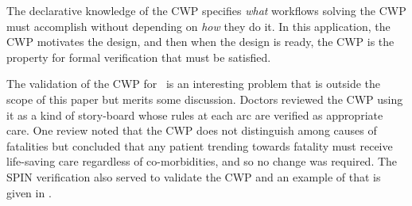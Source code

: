 The declarative knowledge of the CWP specifies \emph{what} workflows solving the CWP must accomplish without depending on \emph{how} they do it. In this application, the CWP motivates the design, and then when the design is ready, the CWP is the property for formal verification that must be satisfied. 

The validation of the CWP for \phware\ is an interesting problem that is outside the scope of this paper but merits some discussion. Doctors reviewed the CWP using it as a kind of story-board whose rules at each arc are verified as appropriate care. One review noted that the CWP does not distinguish among causes of fatalities but concluded that any patient trending towards fatality must receive life-saving care regardless of co-morbidities, and so no change was required. The SPIN verification also served to validate the CWP and an example of that is given in .

